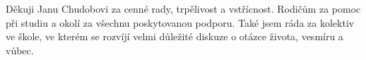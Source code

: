 \startAcknowledgement
Děkuji Janu Chudobovi za cenné rady, trpělivost a vstřícnost. Rodičům za pomoc při studiu a okolí za všechnu poskytovanou podporu. Také jsem ráda za kolektiv ve škole, ve kterém se rozvíjí velmi důležité diskuze o otázce života, vesmíru a vůbec.
\stopAcknowledgement

\endinput
